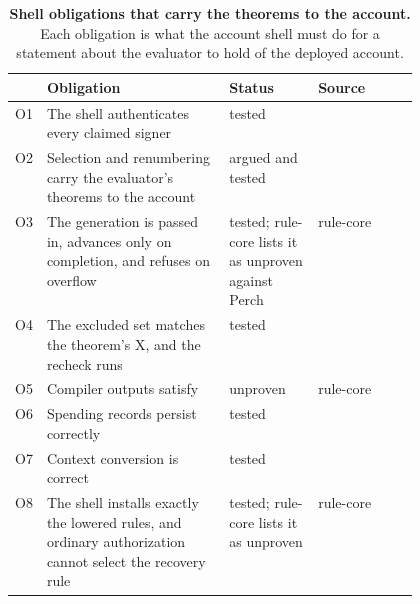 \begin{table}[tbp]
\centering
\caption{\textbf{Shell obligations that carry the theorems to the account.} Each obligation is what the account shell must do for a statement about the evaluator to hold of the deployed account.}\label{tab:tab-obligations}
\scriptsize\begin{tabularx}{\linewidth}{@{}lLp{0.22\linewidth}p{0.25\linewidth}@{}}
\toprule
\textbf{} & \textbf{Obligation} & \textbf{Status} & \textbf{Source} \\
\midrule
O1 & The shell authenticates every claimed signer & tested &  \\
O2 & Selection and renumbering carry the evaluator's theorems to the account & argued and tested &  \\
O3 & The generation is passed in, advances only on completion, and refuses on overflow & tested; rule-core lists it as unproven against Perch  & rule-core  \\
O4 & The excluded set matches the theorem's X, and the recheck runs & tested &  \\
O5 & Compiler outputs satisfy  & unproven & rule-core  \\
O6 & Spending records persist correctly & tested &  \\
O7 & Context conversion is correct & tested &  \\
O8 & The shell installs exactly the lowered rules, and ordinary authorization cannot select the recovery rule & tested; rule-core lists it as unproven & rule-core  \\
\bottomrule
\end{tabularx}
\end{table}
